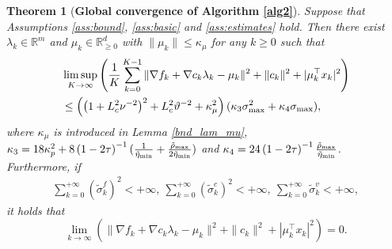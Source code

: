 \documentclass[11pt]{article}
\newtheorem{theorem}{Theorem}
\newcommand{\R}{\mathbb{R}}
\newcommand{\be}{\begin{equation}}
\newcommand{\ee}{\end{equation}}
\begin{document}
\begin{theorem}[{\bf Global convergence of Algorithm \ref{alg2}}]\label{cor:sto-convergence}
    Suppose that Assumptions \ref{ass:bound}, \ref{ass:basic} and \ref{ass:estimates} hold. Then there exist \(\lambda_k \in \R^m\) and \(\mu_k \in \R^d_{\ge 0}\) with \(\|\mu_k\| \leq \kappa_\mu\) for any \(k \geq 0\) such that
    \begin{align*}
    &\limsup_{K \to \infty} \left(\frac{1}{K} \sum_{k=0}^{K-1} \|\nabla f_k + \nabla c_k \lambda_k - \mu_k\|^2 + \|c_k\|^2 + |\mu_k^\top x_k|^2 \right)\\
    &\leq \left(\left(1+L_c^2\nu^{-2}\right)^2+ L_c^2\vartheta^{-2}+\kappa_\mu^2\right) (\kappa_3 \sigma_{\rm max}^2 + \kappa_4 \sigma_{\rm max}),
    \end{align*}
    where $\kappa_\mu$ is introduced in Lemma \ref{bnd_lam_mu}, \(\kappa_3 = 18\kappa_p^2 + 8\left(1-2\tau\right)^{-1}(\frac{1}{\tilde\eta_{\min}}+\frac{\tilde \rho_{\rm max}}{2\tilde \eta_{\rm min}})\) and \(\kappa_4 = 24\left(1-2\tau\right)^{-1}\frac{\tilde \rho_{\rm max}}{\tilde \eta_{\rm min}}\). Furthermore, if 
    \begin{align}\label{cond:error_var}
    \sum_{k=0}^{+\infty} (\tilde \sigma_k^f)^2 < +\infty,~\sum_{k=0}^{+\infty} (\tilde \sigma_k^c)^2 < +\infty,~\sum_{k=0}^{+\infty} \tilde \sigma_k^v < +\infty,
    \end{align}
     it holds that
    \be\label{conv-K}
    \lim_{k \to \infty} \left(\|\nabla f_k + \nabla c_k \lambda_k - \mu_k\|^2 + \|c_k\|^2 + |\mu_k^\top x_k|^2 \right) = 0.
    \ee
\end{theorem}
\end{document}
